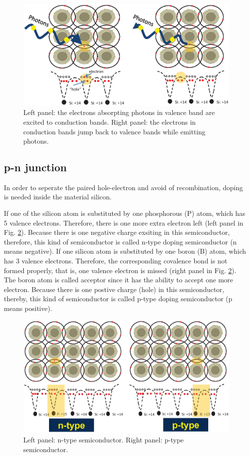 \documentclass[a4paper, 12pt, titlepage,oneside,drop]{kthesis}
\begin{document}
\begin{figure}[H]
\centering
\includegraphics[scale=.6]{combination}
\caption{Left panel: the electrons absorpting photons in valence band are excited to conduction bands. Right panel: the electrons in conduction bands jump back to 
valence bands while emitting photons.}
\label{combination}
\end{figure}


\subsection{p-n junction}

In order to seperate the paired hole-electron and avoid of recombination, doping is needed inside the material silicon. 

If one of the silicon atom is 
substituted by one phosphorous (P) atom, which has 5 valence electrons. Therefore, there is one more extra electron left (left panel in Fig. \ref{nptypes1}). Because there is 
one negative charge exsiting in this semiconductor, therefore, this kind of semiconductor is called n-type doping semiconductor (n means negative). 
If one silicon atom is substituted by one boron (B) atom, which has 3 valence electrons. Therefore, the corresponding covalence bond is not formed
properly, that is, one valence electron is missed (right panel in Fig. \ref{nptypes1}). The boron atom is called acceptor since it has the ability to accept one more electron. Because 
there is one postive charge (hole) in this semiconductor, thereby, this kind of semiconductor is called p-type doping semiconductor (p means positive). 

\begin{figure}[H]
\centering
\includegraphics[scale=.6]{nptypes1}
\caption{Left panel: n-type semiconductor. Right panel: p-type semiconductor.}
\label{nptypes1}
\end{figure}
\end{document}
